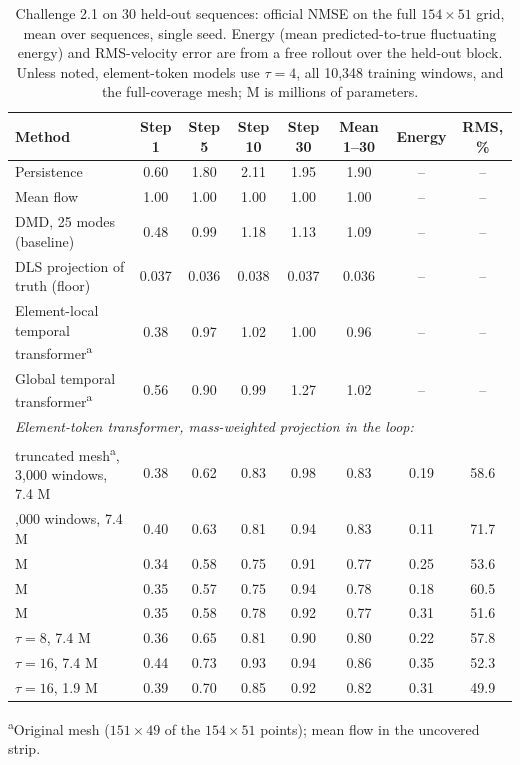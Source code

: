 \documentclass[conf]{new-aiaa}
\begin{document}
\begin{table}[!tbp]
  \centering
  \small
  \setlength{\tabcolsep}{4pt}
  \caption{Challenge 2.1 on 30 held-out sequences: official NMSE on the full $154\times51$ grid, mean over sequences, single seed. Energy (mean predicted-to-true fluctuating energy) and RMS-velocity error are from a free rollout over the held-out block. Unless noted, element-token models use $\tau=4$, all 10,348 training windows, and the full-coverage mesh; M is millions of parameters.}
  \label{tab:challenge}
  \begin{tabular}{lccccccc}
    \toprule
    Method & Step 1 & Step 5 & Step 10 & Step 30 & Mean 1--30 & Energy & RMS, \% \\
    \midrule
    Persistence & 0.60 & 1.80 & 2.11 & 1.95 & 1.90 & -- & -- \\
    Mean flow & 1.00 & 1.00 & 1.00 & 1.00 & 1.00 & -- & -- \\
    DMD, 25 modes (baseline) & 0.48 & 0.99 & 1.18 & 1.13 & 1.09 & -- & -- \\
    DLS projection of truth (floor) & 0.037 & 0.036 & 0.038 & 0.037 & 0.036 & -- & -- \\
    \midrule
    Element-local temporal transformer\textsuperscript{a} & 0.38 & 0.97 & 1.02 & 1.00 & 0.96 & -- & -- \\
    Global temporal transformer\textsuperscript{a} & 0.56 & 0.90 & 0.99 & 1.27 & 1.02 & -- & -- \\
    \midrule
    \multicolumn{8}{l}{\emph{Element-token transformer, mass-weighted projection in the loop:}} \\
    \quad truncated mesh\textsuperscript{a}, 3,000 windows, 7.4 M & 0.38 & 0.62 & 0.83 & 0.98 & 0.83 & 0.19 & 58.6 \\
    \quad 3,000 windows, 7.4 M & 0.40 & 0.63 & 0.81 & 0.94 & 0.83 & 0.11 & 71.7 \\
    \quad 7.4 M & 0.34 & 0.58 & 0.75 & 0.91 & 0.77 & 0.25 & 53.6 \\
    \quad 1.9 M & 0.35 & 0.57 & 0.75 & 0.94 & 0.78 & 0.18 & 60.5 \\
    \quad 0.25 M & 0.35 & 0.58 & 0.78 & 0.92 & 0.77 & 0.31 & 51.6 \\
    \quad $\tau=8$, 7.4 M & 0.36 & 0.65 & 0.81 & 0.90 & 0.80 & 0.22 & 57.8 \\
    \quad $\tau=16$, 7.4 M & 0.44 & 0.73 & 0.93 & 0.94 & 0.86 & 0.35 & 52.3 \\
    \quad $\tau=16$, 1.9 M & 0.39 & 0.70 & 0.85 & 0.92 & 0.82 & 0.31 & 49.9 \\
    \bottomrule
  \end{tabular}

  \smallskip
  {\footnotesize \textsuperscript{a}Original mesh ($151\times49$ of the $154\times51$ points); mean flow in the uncovered strip.}
\end{table}
\end{document}
